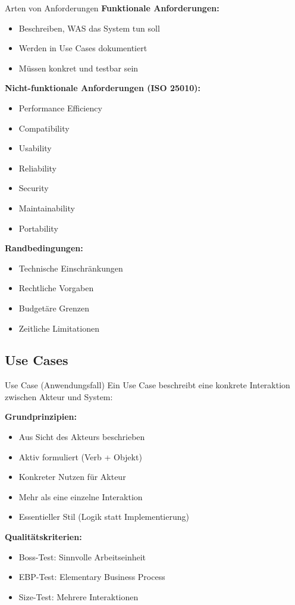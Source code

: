 \begin{concept}{Arten von Anforderungen}
\textbf{Funktionale Anforderungen:}
\begin{itemize}
    \item Beschreiben, WAS das System tun soll
    \item Werden in Use Cases dokumentiert
    \item Müssen konkret und testbar sein
\end{itemize}

\textbf{Nicht-funktionale Anforderungen (ISO 25010):}
\begin{itemize}
    \item Performance Efficiency
    \item Compatibility 
    \item Usability
    \item Reliability
    \item Security
    \item Maintainability
    \item Portability
\end{itemize}

\textbf{Randbedingungen:}
\begin{itemize}
    \item Technische Einschränkungen
    \item Rechtliche Vorgaben
    \item Budgetäre Grenzen
    \item Zeitliche Limitationen
\end{itemize}
\end{concept}

\subsection{Use Cases}

\begin{definition}{Use Case (Anwendungsfall)}
Ein Use Case beschreibt eine konkrete Interaktion zwischen Akteur und System:

\textbf{Grundprinzipien:}
\begin{itemize}
    \item Aus Sicht des Akteurs beschrieben
    \item Aktiv formuliert (Verb + Objekt)
    \item Konkreter Nutzen für Akteur
    \item Mehr als eine einzelne Interaktion
    \item Essentieller Stil (Logik statt Implementierung)
\end{itemize}

\textbf{Qualitätskriterien:}
\begin{itemize}
    \item Boss-Test: Sinnvolle Arbeitseinheit
    \item EBP-Test: Elementary Business Process
    \item Size-Test: Mehrere Interaktionen
\end{itemize}
\end{definition}

